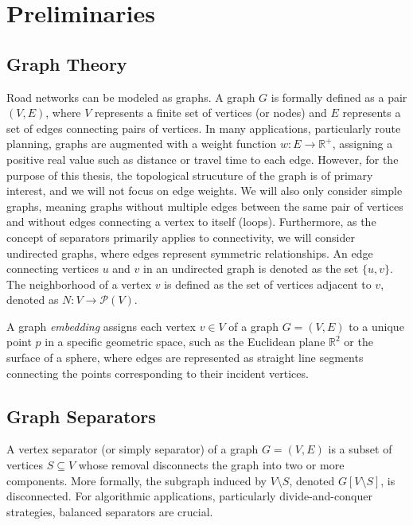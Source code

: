 \chapter{Preliminaries}
\label{ch:preliminaries}


\section{Graph Theory}
\label{sec:graphtheory}

Road networks can be modeled as graphs.
A graph \(G\) is formally defined as a pair \((V, E)\), where \(V\) represents a finite set of vertices (or nodes) and \(E\) represents a set of edges connecting pairs of vertices.
In many applications, particularly route planning, graphs are augmented with a weight function \(w: E \to \mathbb{R}^+\), assigning a positive real value such as distance or travel time to each edge.
However, for the purpose of this thesis, the topological strucuture of the graph is of primary interest, and we will not focus on edge weights.
We will also only consider simple graphs, meaning graphs without multiple edges between the same pair of vertices and without edges connecting a vertex to itself (loops).
Furthermore, as the concept of separators primarily applies to connectivity, we will consider undirected graphs, where edges represent symmetric relationships.
An edge connecting vertices \(u\) and \(v\) in an undirected graph is denoted as the set \(\{u,v\}\).
The neighborhood of a vertex \(v\) is defined as the set of vertices adjacent to \(v\), denoted as \(N : V \to \mathcal{P}(V)\).

A graph \emph{embedding} assigns each vertex \(v \in V\) of a graph \(G = (V, E)\) to a unique point \(p\) in a specific geometric space, such as the Euclidean plane \(\mathbb{R}^2\) or the surface of a sphere, where edges are represented as straight line segments connecting the points corresponding to their incident vertices.

\section{Graph Separators}
\label{sec:graphseparators}

A vertex separator (or simply separator) of a graph \(G = (V, E)\) is a subset of vertices \(S \subseteq V\) whose removal disconnects the graph into two or more components.
More formally, the subgraph induced by \(V \setminus S\), denoted \(G[V \setminus S]\), is disconnected.
For algorithmic applications, particularly divide-and-conquer strategies, balanced separators are crucial.

